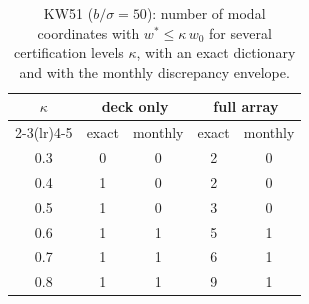 \begin{table}[h]\centering\footnotesize
\caption{KW51 ($b/\sigma=50$): number of modal coordinates with $w^{*}\le\kappa\,w_0$ for several certification levels $\kappa$, with an exact dictionary and with the monthly discrepancy envelope.}\label{tab:s2}
\begin{tabular}{ccccc}\toprule
$\kappa$ & \multicolumn{2}{c}{deck only} & \multicolumn{2}{c}{full array}\\
\cmidrule(lr){2-3}\cmidrule(lr){4-5} & exact & monthly & exact & monthly\\ \midrule
0.3 & 0 & 0 & 2 & 0 \\
0.4 & 1 & 0 & 2 & 0 \\
0.5 & 1 & 0 & 3 & 0 \\
0.6 & 1 & 1 & 5 & 1 \\
0.7 & 1 & 1 & 6 & 1 \\
0.8 & 1 & 1 & 9 & 1 \\
\bottomrule\end{tabular}\end{table}